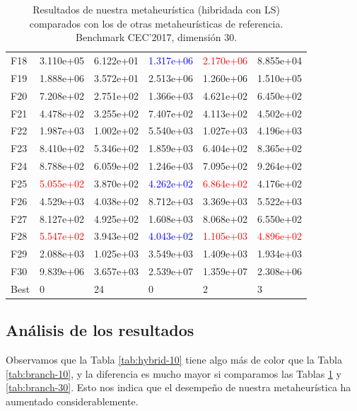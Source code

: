 \documentclass{article}
\begin{document}
\begin{table}[H]
\begin{tabular}{|l|lllll|}
	F18  &  3.110e+05 &  6.122e+01 &  \textcolor{blue}{1.317e+06} &  \textcolor{red}{2.170e+06} &  8.855e+04 \\
	F19  &  1.888e+06 &  3.572e+01 &  2.513e+06 &  1.260e+06 &  1.510e+05 \\
	F20  &  7.208e+02 &  2.751e+02 &  1.366e+03 &  4.621e+02 &  6.450e+02 \\
	F21  &  4.478e+02 &  3.255e+02 &  7.407e+02 &  4.113e+02 &  4.502e+02 \\
	F22  &  1.987e+03 &  1.002e+02 &  5.540e+03 &  1.027e+03 &  4.196e+03 \\
	F23  &  8.410e+02 &  5.346e+02 &  1.859e+03 &  6.404e+02 &  8.365e+02 \\
	F24  &  8.788e+02 &  6.059e+02 &  1.246e+03 &  7.095e+02 &  9.264e+02 \\
	F25  &  \textcolor{red}{5.055e+02} &  3.870e+02 &  \textcolor{blue}{4.262e+02} &  \textcolor{red}{6.864e+02} &  4.176e+02 \\
	F26  &  4.529e+03 &  4.038e+02 &  8.712e+03 &  3.369e+03 &  5.522e+03 \\
	F27  &  8.127e+02 &  4.925e+02 &  1.608e+03 &  8.068e+02 &  6.550e+02 \\
	F28  &  \textcolor{red}{5.547e+02} &  3.943e+02 &  \textcolor{blue}{4.043e+02} &  \textcolor{red}{1.105e+03} &  \textcolor{red}{4.896e+02} \\
	F29  &  2.088e+03 &  1.025e+03 &  3.549e+03 &  1.409e+03 &  1.934e+03 \\
	F30  &  9.839e+06 &  3.657e+03 &  2.539e+07 &  1.359e+07 &  2.308e+06 \\
	Best &          0 &         24 &          0 &          2 &          3 \\
	\hline
\end{tabular}
	\caption{Resultados de nuestra metaheurística (hibridada con LS) comparados con los de otras metaheurísticas de referencia. Benchmark CEC'2017, dimensión 30.}
	\label{tab:hybrid-30}
\end{table}

\subsection{Análisis de los resultados}

Observamos que la Tabla \ref{tab:hybrid-10} tiene algo más de color que la Tabla \ref{tab:branch-10}, y la diferencia es mucho mayor
si comparamos las Tablas \ref{tab:hybrid-30} y \ref{tab:branch-30}. Esto nos indica que el desempeño de nuestra metaheurística ha aumentado
considerablemente.
\end{document}
